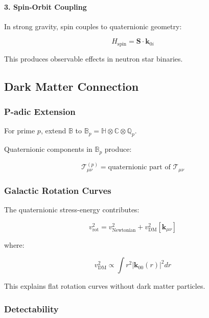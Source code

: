 \paragraph{3. Spin-Orbit Coupling}

In strong gravity, spin couples to quaternionic geometry:

\begin{equation}
H_{\text{spin}} = \mathbf{S} \cdot \mathbf{k}_{0i}
\end{equation}

This produces observable effects in neutron star binaries.

\subsection{Dark Matter Connection}

\subsubsection{P-adic Extension}

For prime $p$, extend $\mathbb{B}$ to $\mathbb{B}_p = \mathbb{H} \otimes \mathbb{C} \otimes \mathbb{Q}_p$.

Quaternionic components in $\mathbb{B}_p$ produce:

\begin{equation}
\mathcal{T}^{(p)}_{\mu\nu} = \text{quaternionic part of } \mathcal{T}_{\mu\nu}
\end{equation}

\subsubsection{Galactic Rotation Curves}

The quaternionic stress-energy contributes:

\begin{equation}
v_{\text{rot}}^2 = v_{\text{Newtonian}}^2 + v_{\text{DM}}^2[\mathbf{k}_{\mu\nu}]
\end{equation}

where:

\begin{equation}
v_{\text{DM}}^2 \propto \int r^2 |\mathbf{k}_{00}(r)|^2 dr
\end{equation}

This explains flat rotation curves without dark matter particles.

\subsubsection{Detectability}

